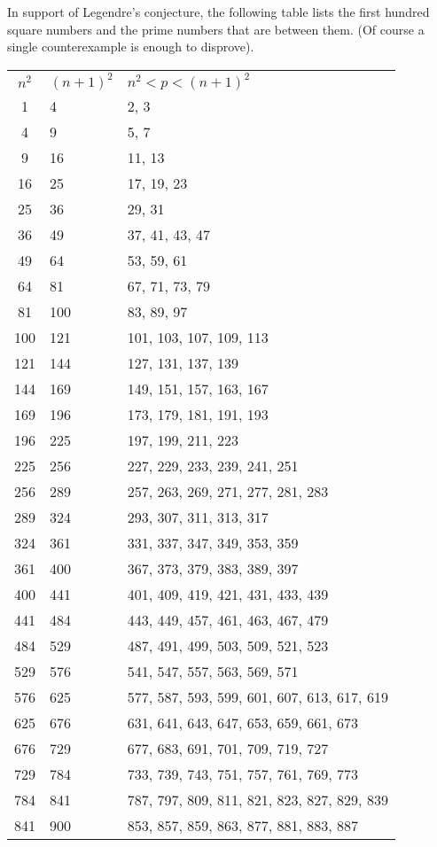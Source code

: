 \documentclass[12pt]{article}
\begin{document}
In support of Legendre's conjecture, the following table lists the first hundred square numbers and the prime numbers that are between them. (Of course a single counterexample is enough to disprove).

\begin{tabular}{|c|l|l|}
$n^2$ & $(n + 1)^2$ & $n^2 < p < (n + 1)^2$ \\
1 & 4 & 2, 3 \\
4 & 9 & 5, 7 \\
9 & 16 & 11, 13 \\
16 & 25 & 17, 19, 23 \\
25 & 36 & 29, 31 \\
36 & 49 & 37, 41, 43, 47 \\
49 & 64 & 53, 59, 61 \\
64 & 81 & 67, 71, 73, 79 \\
81 & 100 & 83, 89, 97 \\
100 & 121 & 101, 103, 107, 109, 113 \\
121 & 144 & 127, 131, 137, 139 \\
144 & 169 & 149, 151, 157, 163, 167 \\
169 & 196 & 173, 179, 181, 191, 193 \\
196 & 225 & 197, 199, 211, 223 \\
225 & 256 & 227, 229, 233, 239, 241, 251 \\
256 & 289 & 257, 263, 269, 271, 277, 281, 283 \\
289 & 324 & 293, 307, 311, 313, 317 \\
324 & 361 & 331, 337, 347, 349, 353, 359 \\
361 & 400 & 367, 373, 379, 383, 389, 397 \\
400 & 441 & 401, 409, 419, 421, 431, 433, 439 \\
441 & 484 & 443, 449, 457, 461, 463, 467, 479 \\
484 & 529 & 487, 491, 499, 503, 509, 521, 523 \\
529 & 576 & 541, 547, 557, 563, 569, 571 \\
576 & 625 & 577, 587, 593, 599, 601, 607, 613, 617, 619 \\
625 & 676 & 631, 641, 643, 647, 653, 659, 661, 673 \\
676 & 729 & 677, 683, 691, 701, 709, 719, 727 \\
729 & 784 & 733, 739, 743, 751, 757, 761, 769, 773 \\
784 & 841 & 787, 797, 809, 811, 821, 823, 827, 829, 839 \\
841 & 900 & 853, 857, 859, 863, 877, 881, 883, 887 \\

\end{tabular}
\end{document}
